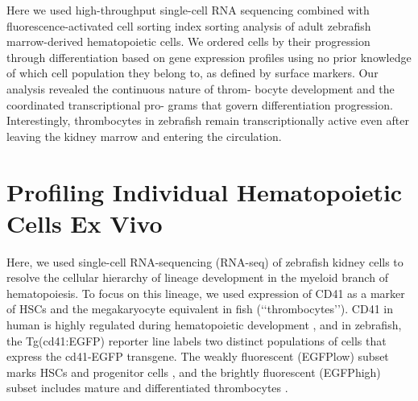 Here we used high-throughput single-cell RNA sequencing combined with fluorescence-activated cell sorting index sorting analysis of adult zebrafish marrow-derived hematopoietic cells. We ordered cells by their progression through differentiation based on gene expression profiles using no prior knowledge of which cell population they belong to, as defined by surface markers. Our analysis revealed the continuous nature of throm- bocyte development and the coordinated transcriptional pro- grams that govern differentiation progression. Interestingly, thrombocytes in zebrafish remain transcriptionally active even after leaving the kidney marrow and entering the circulation.

\section{Profiling Individual Hematopoietic Cells Ex Vivo}

Here, we used single-cell RNA-sequencing (RNA-seq) of zebrafish kidney cells to resolve the cellular hierarchy of lineage development in the myeloid branch of hematopoiesis. To focus on this lineage, we used expression of CD41 as a marker of HSCs and the megakaryocyte equivalent in fish (‘‘thrombocytes’’). CD41 in human is highly regulated during hematopoietic development  \cite{Debili2001-ib, Robin2011-en}, and in zebrafish, the Tg(cd41:EGFP) reporter line labels two distinct populations of cells that express the cd41-EGFP transgene. The weakly fluorescent (EGFPlow) subset marks HSCs and progenitor cells \cite{Ma2011-hg}, and the brightly fluorescent (EGFPhigh) subset includes mature and differentiated thrombocytes \cite{Ma2011-hg}.


